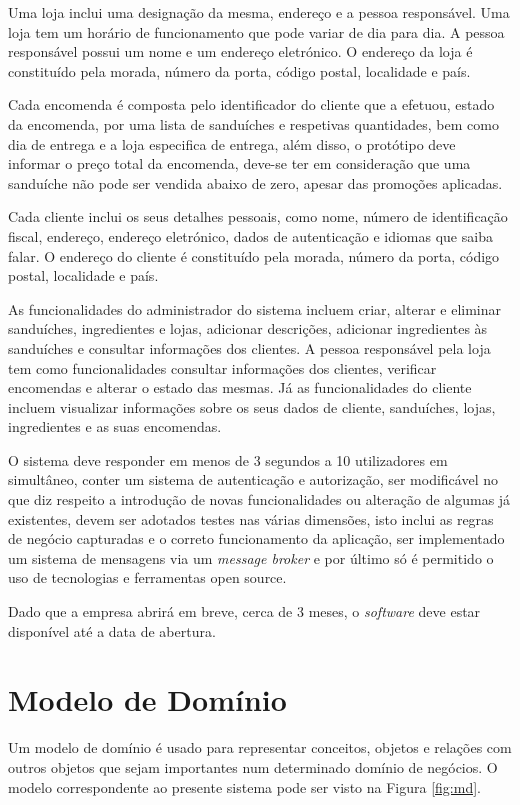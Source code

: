 Uma loja inclui uma designação da mesma, endereço e a pessoa responsável. Uma loja tem um horário de funcionamento que pode variar de dia para dia. A pessoa responsável possui um nome e um endereço eletrónico. O endereço da loja é constituído pela morada, número da porta, código postal, localidade e país.

Cada encomenda é composta pelo identificador do cliente que a efetuou, estado da encomenda, por uma lista de sanduíches e respetivas quantidades, bem como dia de entrega e a loja especifica de entrega, além disso, o protótipo deve informar o preço total da encomenda, deve-se ter em consideração que uma sanduíche não pode ser vendida abaixo de zero, apesar das promoções aplicadas.

Cada cliente inclui os seus detalhes pessoais, como nome, número de identificação fiscal, endereço, endereço eletrónico, dados de autenticação e idiomas que saiba falar. O endereço do cliente é constituído pela morada, número da porta, código postal, localidade e país.

As funcionalidades do administrador do sistema incluem criar, alterar e eliminar sanduíches, ingredientes e lojas, adicionar descrições, adicionar ingredientes às sanduíches e consultar informações dos clientes. A pessoa responsável pela loja tem como funcionalidades consultar informações dos clientes, verificar encomendas e alterar o estado das mesmas. Já as funcionalidades do cliente incluem visualizar informações sobre os seus dados de cliente, sanduíches, lojas, ingredientes e as suas encomendas.

O sistema deve responder em menos de 3 segundos a 10 utilizadores em simultâneo, conter um sistema de autenticação e autorização, ser modificável no que diz respeito a introdução de novas funcionalidades ou alteração de algumas já existentes, devem ser adotados testes nas várias dimensões, isto inclui as regras de negócio capturadas e o correto funcionamento da aplicação, ser implementado um sistema de mensagens via um \textit{message broker} e por último só é permitido o uso de tecnologias e ferramentas open source.

Dado que a empresa abrirá em breve, cerca de 3 meses, o \textit{software} deve estar disponível até a data de abertura.

\section{Modelo de Domínio}

Um modelo de domínio é usado para representar conceitos, objetos e relações com outros objetos que sejam importantes num determinado domínio de negócios. O modelo correspondente ao presente sistema pode ser visto na Figura \ref{fig:md}.

